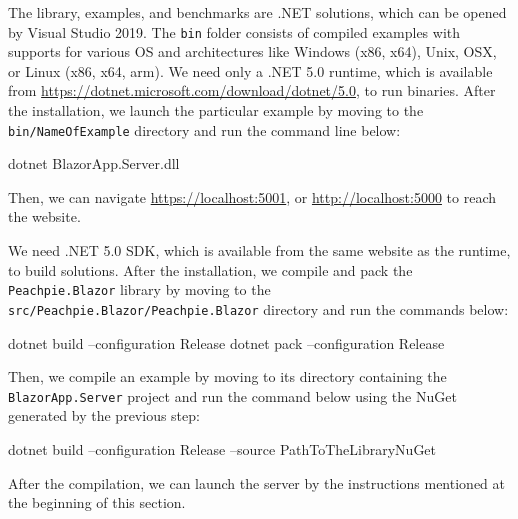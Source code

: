 \documentclass[12pt,a4paper]{report}
\let\openright=\clearpage
\begin{document}
The library, examples, and benchmarks are .NET solutions, which can be opened by Visual Studio 2019.
The \texttt{bin} folder consists of compiled examples with supports for various OS and architectures like Windows (x86, x64), Unix, OSX, or Linux (x86, x64, arm).
We need only a .NET 5.0 runtime, which is available from \url{https://dotnet.microsoft.com/download/dotnet/5.0}, to run binaries.
After the installation, we launch the particular example by moving to the \texttt{bin/NameOfExample} directory and run the command line below:
\par
\begin{code}[frame=none]
dotnet BlazorApp.Server.dll
\end{code}
\par
Then, we can navigate \url{https://localhost:5001}, or \url{http://localhost:5000} to reach the website.
\par
We need .NET 5.0 SDK, which is available from the same website as the runtime, to build solutions.
After the installation, we compile and pack the \texttt{Peachpie.Blazor} library by moving to the \texttt{src/Peachpie.Blazor/Peachpie.Blazor} directory and run the commands below:
\par
\begin{code}[frame=none]
dotnet build --configuration Release
dotnet pack --configuration Release
\end{code}
\par
Then, we compile an example by moving to its directory containing the \texttt{BlazorApp.Server} project and run the command below using the NuGet generated by the previous step:
\par
\begin{code}[frame=none]
dotnet build --configuration Release --source PathToTheLibraryNuGet
\end{code}
\par
After the compilation, we can launch the server by the instructions mentioned at the beginning of this section.

\openright
\end{document}
